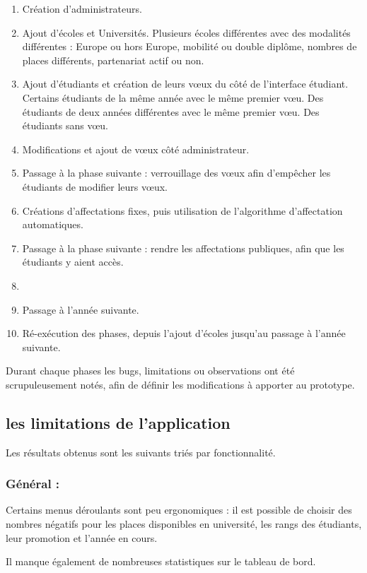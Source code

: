 \begin{enumerate}
\item Création d'administrateurs.
\item Ajout d'écoles et Universités. Plusieurs écoles différentes avec des modalités différentes : Europe ou hors Europe, mobilité ou double diplôme, nombres de places différents, partenariat actif ou non.
\item Ajout d'étudiants et création de leurs vœux du côté de l'interface étudiant. Certains étudiants de la même année avec le même premier vœu. Des étudiants de deux années différentes avec le même premier vœu. Des étudiants sans vœu.
\item Modifications et ajout de vœux côté administrateur.
\item Passage à la phase suivante : verrouillage des vœux afin d'empêcher les étudiants de modifier leurs vœux.
\item Créations d'affectations fixes, puis utilisation de l'algorithme d'affectation automatiques.
\item Passage à la phase suivante : rendre les affectations publiques, afin que les étudiants y aient accès.
\item 
\item Passage à l'année suivante.
\item Ré-exécution des phases, depuis l'ajout d'écoles jusqu'au passage à l'année suivante.
\end{enumerate}


Durant chaque phases les bugs, limitations ou observations ont été scrupuleusement notés, afin de définir les modifications à apporter au prototype.


\subsection{les limitations de l'application}

Les résultats obtenus sont les suivants triés par fonctionnalité.

\subsubsection{Général :}
Certains menus déroulants sont peu ergonomiques : il est possible de choisir des nombres négatifs pour les places disponibles en université, les rangs des étudiants, leur promotion et l'année en cours.

Il manque également de nombreuses statistiques sur le tableau de bord.

